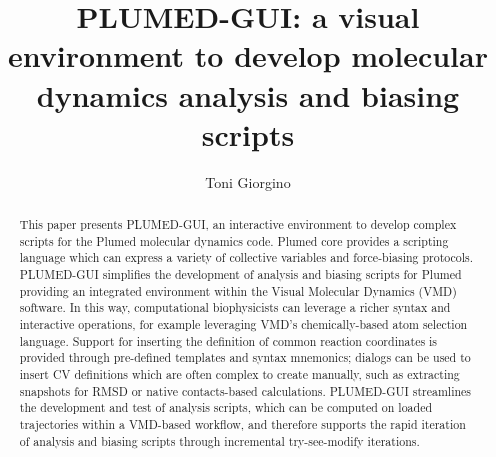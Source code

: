 \documentclass[preprint,12pt]{elsarticle}
\newcommand{\mytitle}{PLUMED-GUI: a visual environment to develop
  molecular dynamics analysis and biasing scripts}
\begin{document}
\begin{frontmatter}


\title{\mytitle}
\author{Toni Giorgino}
\address{Institute of Biomedical Engineering (ISIB),\\ 
National Research Council of Italy (CNR),\\
Padua, Italy}




\begin{abstract}
  This paper presents PLUMED-GUI, an interactive environment to
  develop complex scripts for the Plumed molecular dynamics
  code. Plumed core provides a scripting language which can express a
  variety of collective variables and force-biasing
  protocols. PLUMED-GUI simplifies the development of analysis and
  biasing scripts for Plumed providing an integrated environment
  within the Visual Molecular Dynamics (VMD) software. In this way,
  computational biophysicists can leverage a richer syntax and
  interactive operations, for example leveraging VMD's
  chemically-based atom selection language.  Support for inserting the
  definition of common reaction coordinates is provided through
  pre-defined templates and syntax mnemonics; dialogs can be used to
  insert CV definitions which are often complex to create manually,
  such as extracting snapshots for RMSD or native contacts-based
  calculations.  PLUMED-GUI streamlines the development and test of
  analysis scripts, which can be computed on loaded trajectories
  within a VMD-based workflow, and therefore supports the rapid
  iteration of analysis and biasing scripts through incremental
  try-see-modify iterations.
\end{abstract}


\end{frontmatter}
\end{document}
